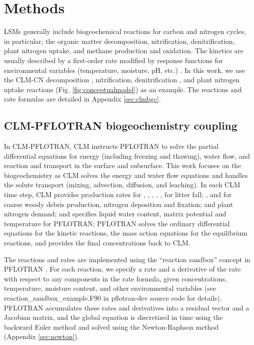 \documentclass[gmd, manuscript]{copernicus}
\begin{document}
\section{Methods}
LSMs generally include biogeochemical reactions for carbon and nitrogen cycles,
in particular, the organic matter decomposition, nitrification,
denitrification, plant nitrogen uptake,  and methane production and oxidation.
The kinetics are usually described by a first-order rate modified by response
functions for environmental variables (temperature, moisture, pH, etc.)
\citep{Bonan2012,Boyer2006,Schmidt2011}.  In this work, we use the CLM-CN
decomposition \citep{Bonan2012,Oleson2013,Thornton2005}, nitrification,
denitrification \citep{Dickinson2002,Parton2001,Parton1996}, and plant nitrogen
uptake reactions (Fig. \ref{fig:conceptualmodel}) as an example. The reactions
and rate formulae are detailed in Appendix \ref{sec:clmbgc}.

\subsection{CLM-PFLOTRAN biogeochemistry coupling}
In CLM-PFLOTRAN, CLM instructs PFLOTRAN to solve the partial differential
equations for energy (including freezing and thawing), water flow, and reaction
and transport in the surface and subsurface. This work focuses on the
biogeochemistry as CLM solves the energy and water flow equations and handles
the solute transport (mixing, advection, diffusion, and leaching). In each CLM
time step, CLM provides production rates for , ,
, , ,  for litter fall;
, and  for coarse woody debris production, nitrogen
deposition and fixation; and plant nitrogen demand; and specifies liquid water
content, matrix potential and temperature for PFLOTRAN; PFLOTRAN solves the
ordinary differential equations for the kinetic reactions, the mass action
equations for the equilibrium reactions, and provides the final concentrations
back to CLM.   

The reactions and rates are implemented using the ``reaction sandbox'' concept
in PFLOTRAN \citep{Lichtner2015}. For each reaction, we specify a rate and a
derivative of the rate with respect to any components in the rate formula,
given concentrations, temperature, moisture content, and other environmental
variables (see reaction\_sandbox\_example.F90 in pflotran-dev source code for
details). PFLOTRAN accumulates these rates and derivatives into a residual
vector and a Jacobian matrix, and the global equation is discretized in time
using the backward Euler method and solved using the Newton-Raphson method
(Appendix \ref{sec:newton}).
\end{document}
